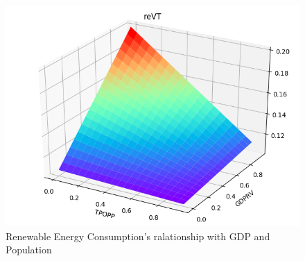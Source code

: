 \documentclass{mcmthesis}
\begin{document}
\begin{figure} [h]
\small
\centering
\includegraphics[width=12cm]{CA_reVT.png}
\caption{Renewable Energy Consumption's ralationship with GDP and Population} \label{fig:aa}
\end{figure}
%
\end{document}
